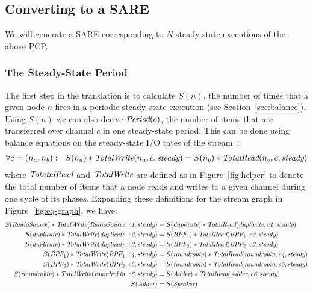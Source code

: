 \subsection{Converting to a SARE}

We will generate a SARE corresponding to $N$ steady-state executions
of the above PCP.

\subsubsection{The Steady-State Period}

The first step in the translation is to calculate $S(n)$, the number
of times that a given node $n$ fires in a periodic steady-state
execution (see Section~\ref{sec:balance}).  Using $S(n)$ we can also
derive $\mbox{\it Period}(c)$, the number of items that are transferred over
channel $c$ in one steady-state period.  This can be done using
balance equations on the steady-state I/O rates of the
stream~\cite{leesdf}:
\begin{align*}
\forall c = (n_a, n_b):~~S(n_a) * \mbox{\it TotalWrite}(n_a, c, \mbox{\it steady}) 
  = S(n_b) * \mbox{\it TotalRead}(n_b, c, \mbox{\it steady})
\end{align*}
where $\mbox{\it TotatalRead}$ and $\mbox{\it TotalWrite}$ are defined as in
Figure~\ref{fig:helper} to denote the total number of items that a
node reads and writes to a given channel during one cycle of its
phases.  Expanding these definitions for the 
\clearpage \noindent stream graph in Figure~\ref{fig:eq-graph}, we
have:
\begin{align*}
S(\mbox{\it RadioSource}) * \mbox{\it TotalWrite}(\mbox{\it RadioSource}, \mbox{\it c1}, \mbox{\it steady}) 
  &= S(\mbox{\it duplicate}) * \mbox{\it TotalRead}(\mbox{\it duplicate}, \mbox{\it c1}, \mbox{\it steady}) \\
S(\mbox{\it duplicate}) * \mbox{\it TotalWrite}(\mbox{\it duplicate}, \mbox{\it c2}, \mbox{\it steady}) 
  &= S(\mbox{\it BPF}_1) * \mbox{\it TotalRead}(\mbox{\it BPF}_1, \mbox{\it c2}, \mbox{\it steady}) \\
S(\mbox{\it duplicate}) * \mbox{\it TotalWrite}(\mbox{\it duplicate}, \mbox{\it c3}, \mbox{\it steady})
  &= S(\mbox{\it BPF}_2) * \mbox{\it TotalRead}(\mbox{\it BPF}_2, \mbox{\it c3}, \mbox{\it steady}) \\
S(\mbox{\it BPF}_1) * \mbox{\it TotalWrite}(\mbox{\it BPF}_1, \mbox{\it c4}, \mbox{\it steady}) 
  &= S(\mbox{\it roundrobin}) * \mbox{\it TotalRead}(\mbox{\it roundrobin}, \mbox{\it c4}, \mbox{\it steady}) \\
S(\mbox{\it BPF}_2) * \mbox{\it TotalWrite}(\mbox{\it BPF}_2, \mbox{\it c5}, \mbox{\it steady}) 
  &= S(\mbox{\it roundrobin}) * \mbox{\it TotalRead}(\mbox{\it roundrobin}, \mbox{\it c5}, \mbox{\it steady}) \\
S(\mbox{\it roundrobin}) * \mbox{\it TotalWrite}(\mbox{\it roundrobin}, \mbox{\it c6}, \mbox{\it steady})
  &= S(\mbox{\it Adder}) * \mbox{\it TotalRead}(\mbox{\it Adder}, \mbox{\it c6}, \mbox{\it steady}) \\
S(\mbox{\it Adder}) 
  &= S(\mbox{\it Speaker})
\end{align*}
